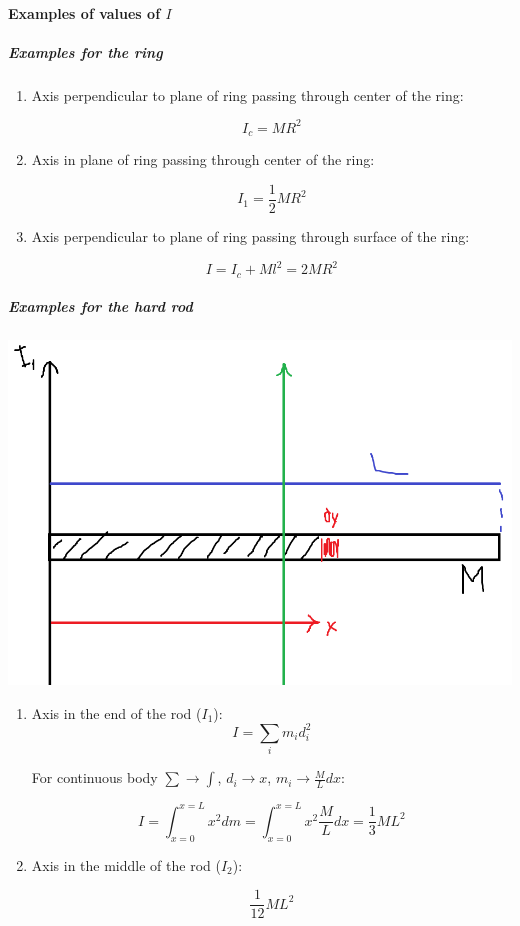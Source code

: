 \paragraph{Examples of values of $I$}
\subparagraph{Examples for the ring}
\begin{enumerate}
	\item Axis perpendicular to plane of ring passing through center of the ring:
	
	$$I_c = MR^2$$
	\item Axis in plane of ring passing through center of the ring:
	
	$$I_1 = \frac{1}{2}MR^2$$
	\item Axis perpendicular to plane of ring passing through surface of the ring:
	
	$$I = I_c + Ml^2 = 2MR^2$$
\end{enumerate}
\subparagraph{Examples for the hard rod}

\begin{center}
	\includegraphics[width=0.9\linewidth]{./lect17/pic1.png}
\end{center}

\begin{enumerate}
	\item Axis in the end of the rod ($I_1$):
	$$I = \sum_i m_i d_i^2$$
	
	For continuous body $\sum \to \int$, $d_i \to x$, $m_i \to \frac{M}{L}dx$:
	
	$$I = \int_{x=0}^{x=L} x^2 dm  = \int_{x=0}^{x=L} x^2 \frac{M}{L}dx= \frac{1}{3}ML^2 $$
	
	\item Axis in the middle of the rod ($I_2$):

	$$\frac{1}{12}ML^2 $$
\end{enumerate}

